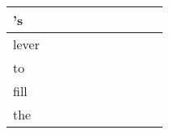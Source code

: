 \documentclass[landscape]{article}
\newcommand{\ssp}{\hspace{2pt}}
\begin{document}
\begin{tabular}{|l|p{10pt}|p{10pt}|p{10pt}|p{10pt}|p{10pt}|p{10pt}|p{10pt}|p{10pt}|p{10pt}|}
\hline
\ssp 's \ssp&\hspace{2pt}&\hspace{2pt}&\hspace{2pt}&\hspace{2pt}&\hspace{2pt}&\hspace{2pt}&\hspace{2pt}&\hspace{2pt}&\hspace{2pt}\\
\hline
\ssp lever \ssp&\hspace{2pt}&\hspace{2pt}&\hspace{2pt}&\hspace{2pt}&\hspace{2pt}&\hspace{2pt}&\hspace{2pt}&\hspace{2pt}&\hspace{2pt}\\
\hline
\ssp to \ssp&\hspace{2pt}&\hspace{2pt}&\hspace{2pt}&\hspace{2pt}&\hspace{2pt}&\hspace{2pt}&\hspace{2pt}&\hspace{2pt}&\hspace{2pt}\\
\hline
\ssp fill \ssp&\hspace{2pt}&\hspace{2pt}&\hspace{2pt}&\hspace{2pt}&\hspace{2pt}&\hspace{2pt}&\hspace{2pt}&\hspace{2pt}&\hspace{2pt}\\
\hline
\ssp the \ssp&\hspace{2pt}&\hspace{2pt}&\hspace{2pt}&\hspace{2pt}&\hspace{2pt}&\hspace{2pt}&\hspace{2pt}&\hspace{2pt}&\hspace{2pt}\\

\end{tabular}
\end{document}
